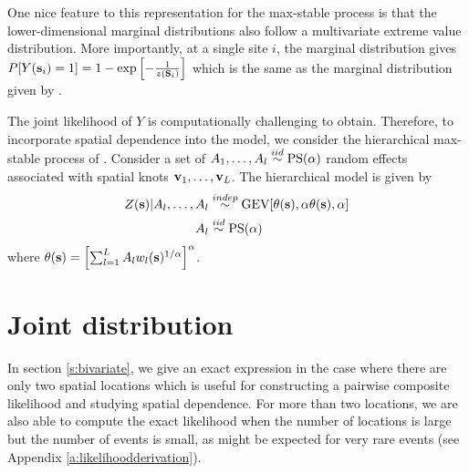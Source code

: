 \documentclass[11pt]{article}
\begin{document}
One nice feature to this representation for the max-stable process is that the lower-dimensional marginal distributions also follow a multivariate extreme value distribution.
More importantly, at a single site $i$, the marginal distribution gives \mbox{$P[Y(\mbox{\bf s}_i) = 1] = 1 - \exp\left[ -\frac{ 1 }{ z(\mbox{\bf s}_i)} \right]$} which is the same as the marginal distribution given by \citet{Wang2010}.

The joint likelihood of $Y$ is computationally challenging to obtain.
Therefore, to incorporate spatial dependence into the model, we consider the hierarchical max-stable process of \citet{Reich2012}.
Consider a set of $A_1, \ldots, A_l \stackrel{iid}{\sim} \text{PS}(\alpha)$ random effects associated with spatial knots $\mbox{\bf v}_1, \ldots, \mbox{\bf v}_L$.
The hierarchical model is given by
\begin{align}
  Z(\mbox{\bf s}) | A_l, \ldots, A_l &\stackrel{indep}{\sim} \text{GEV}[\theta(\mbox{\bf s}), \alpha \theta(\mbox{\bf s}), \alpha] \\
  A_l &\stackrel{iid}{\sim} \text{PS}(\alpha)
\end{align}
where $\theta(\mbox{\bf s}) = \left[\sum_{l = 1}^L A_l w_l (\mbox{\bf s})^{1 / \alpha} \right]^\alpha$.



\section{Joint distribution}\label{s:multivariate}

In section \ref{s:bivariate}, we give an exact expression in the case where there are only two spatial locations which is useful for constructing a pairwise composite likelihood and studying spatial dependence.
For more than two locations, we are also able to compute the exact likelihood when the number of locations is large but the number of events is small, as might be expected for very rare events (see Appendix \ref{a:likelihoodderivation}).
\end{document}
